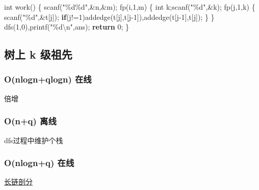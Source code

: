 \documentclass[
]{article}
\newenvironment{Shaded}{}{}
\newcommand{\ControlFlowTok}[1]{\textcolor[rgb]{0.00,0.44,0.13}{\textbf{#1}}}
\newcommand{\DataTypeTok}[1]{\textcolor[rgb]{0.56,0.13,0.00}{#1}}
\newcommand{\DecValTok}[1]{\textcolor[rgb]{0.25,0.63,0.44}{#1}}
\newcommand{\NormalTok}[1]{#1}
\newcommand{\SpecialCharTok}[1]{\textcolor[rgb]{0.25,0.44,0.63}{#1}}
\newcommand{\StringTok}[1]{\textcolor[rgb]{0.25,0.44,0.63}{#1}}
\begin{document}
\begin{Shaded}
\begin{Highlighting}[]
\DataTypeTok{int}\NormalTok{ work()}
\NormalTok{\{}
\NormalTok{    scanf(}\StringTok{"}\SpecialCharTok{\%d\%d}\StringTok{"}\NormalTok{,\&n,\&m);}
\NormalTok{    fp(i,}\DecValTok{1}\NormalTok{,m)}
\NormalTok{    \{}
        \DataTypeTok{int}\NormalTok{ k;scanf(}\StringTok{"}\SpecialCharTok{\%d}\StringTok{"}\NormalTok{,\&k);}
\NormalTok{        fp(j,}\DecValTok{1}\NormalTok{,k)}
\NormalTok{        \{}
\NormalTok{            scanf(}\StringTok{"}\SpecialCharTok{\%d}\StringTok{"}\NormalTok{,\&t[j]);}
            \ControlFlowTok{if}\NormalTok{(j!=}\DecValTok{1}\NormalTok{)addedge(t[j],t[j{-}}\DecValTok{1}\NormalTok{]),addedge(t[j{-}}\DecValTok{1}\NormalTok{],t[j]);}
\NormalTok{        \}}
\NormalTok{    \}}
\NormalTok{    dfs(}\DecValTok{1}\NormalTok{,}\DecValTok{0}\NormalTok{),printf(}\StringTok{"}\SpecialCharTok{\%d\textbackslash{}n}\StringTok{"}\NormalTok{,ans);}
    \ControlFlowTok{return} \DecValTok{0}\NormalTok{;}
\NormalTok{\}}
\end{Highlighting}
\end{Shaded}

\hypertarget{ux6811ux4e0a-k-ux7ea7ux7956ux5148}{%
\subsection{树上 k 级祖先}\label{ux6811ux4e0a-k-ux7ea7ux7956ux5148}}

\hypertarget{onlognqlogn-ux5728ux7ebf}{%
\subsubsection{O(nlogn+qlogn) 在线}\label{onlognqlogn-ux5728ux7ebf}}

倍增

\hypertarget{onq-ux79bbux7ebf}{%
\subsubsection{O(n+q) 离线}\label{onq-ux79bbux7ebf}}

dfs过程中维护个栈

\hypertarget{onlognq-ux5728ux7ebf}{%
\subsubsection{O(nlogn+q) 在线}\label{onlognq-ux5728ux7ebf}}

\href{https://zhuanlan.zhihu.com/p/25984772}{长链剖分}
\end{document}
